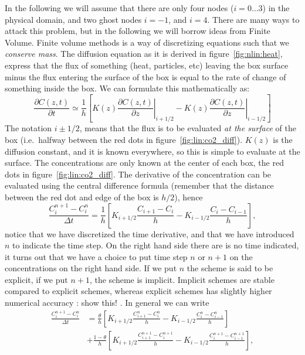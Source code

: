 \documentclass[graybox,sectrefs,envcountresetchap,open=right,final]{svmonodo}
\newcommand{\shortinlinecomment}[3]{{\color{red}{\bf #1}: #2}}
\begin{document}
In the following we will assume that there are only four nodes ($i=0\ldots 3$) in the physical domain, and two ghost nodes $i=-1$, and $i=4$. There are many ways to attack this problem, but in the following we will borrow ideas from Finite Volume. Finite volume methods is a way of discretizing equations such that we \emph{conserve mass}. The diffusion equation as it is derived in figure~\ref{fig:nlin:heat}, express that the flux of something (heat, particles, etc) leaving the box surface minus the flux entering the surface of the box is equal to the rate of change of something inside the box. We can formulate this mathematically as:
\begin{equation}
\frac{\partial C(z,t)}{\partial t}\simeq\frac{1}{h}\left[\left.K(z)\frac{\partial C(z,t)}{\partial z}\right|_{i+1/2}
-\left.K(z)\frac{\partial C(z,t)}{\partial z}\right|_{i-1/2}\right]
\label{eq:lin:co2fv}
\end{equation}
The notation $i\pm1/2$, means that the flux is to be evaluated \emph{at the surface} of the box (i.e.~halfway between the red dots in figure~\ref{fig:lin:co2_diff}). $K(z)$ is the diffusion constant, and it is known everywhere, so this is simple to evaluate at the surface. The concentrations are only known at the center of each box, the red dots in figure~\ref{fig:lin:co2_diff}. The derivative of the concentration can be evaluated using the central difference formula (remember that the distance between the red dot and edge of the box is $h/2$), hence
\begin{equation}
\frac{C_i^{n+1}-C_i^n}{\Delta t}=\frac{1}{h}\left[K_{i+1/2}\frac{ C_{i+1}-C_{i}}{h}-K_{i-1/2}\frac{ C_{i}-C_{i-1}}{h}\right],
\label{eq:lin:co2fv2}
\end{equation}
notice that we have discretized the time derivative, and that we have introduced $n$ to indicate the time step. On the right hand side there are is no time indicated, it turns out that we have a choice to put time step $n$ or $n+1$ on the concentrations on the right hand side. If we put $n$ the scheme is said to be explicit, if we put $n+1$, the scheme is implicit. Implicit schemes are stable compared to explicit schemes, whereas explicit schemes has slightly higher numerical accuracy \shortinlinecomment{TO DO 1}{ show this! }{ show this! }. In general we can write
\begin{align}
\frac{C_i^{n+1}-C_i^n}{\Delta t}&=\frac{\theta}{h}\left[K_{i+1/2}
\frac{C^n_{i+1}-C^n_{i}}{h}-K_{i-1/2}\frac{C^n_{i}-C^n_{i-1}}{h}\right]\\ 
&+\frac{1-\theta}{h}\left[K_{i+1/2}
\frac{C_{i+1}^{n+1}-C_{i}^{n+1}}{h}-K_{i-1/2}\frac{ C_{i}^{n+1}-C_{i-1}^{n+1}}{h}\right],
\label{eq:lin:co2fv23}
\end{align}
\end{document}
